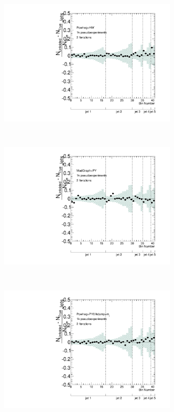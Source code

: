 \begin{figure}
\begin{subfigure}[]{0.45\textwidth}
\includegraphics[width=\textwidth]{fig/Stress/105860atlfast/FracBias2Iterations.pdf}
\end{subfigure}
~
\begin{subfigure}[]{0.45\textwidth}
\includegraphics[width=\textwidth]{fig/Stress/110872atlfast/FracBias2Iterations.pdf}
\end{subfigure}
\\
\begin{subfigure}[]{0.45\textwidth}
\includegraphics[width=\textwidth]{fig/Stress/110404atlfast/FracBias2Iterations.pdf}

\end{subfigure}
\end{figure}
